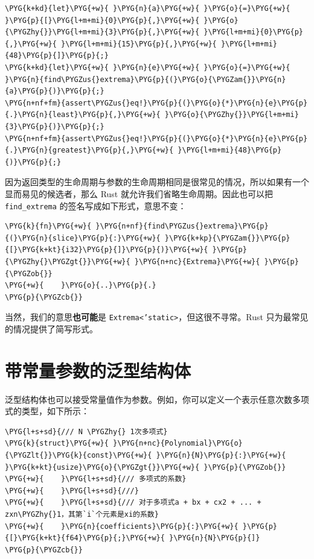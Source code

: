 \begin{Verbatim}[commandchars=\\\{\},breaklines=true,breakanywhere=true,fontsize=\codefont,xleftmargin=17bp]
\PYG{k+kd}{let}\PYG{+w}{ }\PYG{n}{a}\PYG{+w}{ }\PYG{o}{=}\PYG{+w}{ }\PYG{p}{[}\PYG{l+m+mi}{0}\PYG{p}{,}\PYG{+w}{ }\PYG{o}{\PYGZhy{}}\PYG{l+m+mi}{3}\PYG{p}{,}\PYG{+w}{ }\PYG{l+m+mi}{0}\PYG{p}{,}\PYG{+w}{ }\PYG{l+m+mi}{15}\PYG{p}{,}\PYG{+w}{ }\PYG{l+m+mi}{48}\PYG{p}{]}\PYG{p}{;}
\PYG{k+kd}{let}\PYG{+w}{ }\PYG{n}{e}\PYG{+w}{ }\PYG{o}{=}\PYG{+w}{ }\PYG{n}{find\PYGZus{}extrema}\PYG{p}{(}\PYG{o}{\PYGZam{}}\PYG{n}{a}\PYG{p}{)}\PYG{p}{;}
\PYG{n+nf+fm}{assert\PYGZus{}eq!}\PYG{p}{(}\PYG{o}{*}\PYG{n}{e}\PYG{p}{.}\PYG{n}{least}\PYG{p}{,}\PYG{+w}{ }\PYG{o}{\PYGZhy{}}\PYG{l+m+mi}{3}\PYG{p}{)}\PYG{p}{;}
\PYG{n+nf+fm}{assert\PYGZus{}eq!}\PYG{p}{(}\PYG{o}{*}\PYG{n}{e}\PYG{p}{.}\PYG{n}{greatest}\PYG{p}{,}\PYG{+w}{ }\PYG{l+m+mi}{48}\PYG{p}{)}\PYG{p}{;}
\end{Verbatim}

因为返回类型的生命周期与参数的生命周期相同是很常见的情况，所以如果有一个显而易见的候选者，那么 Rust 就允许我们省略生命周期。因此也可以把 \texttt{find\_extrema} 的签名写成如下形式，意思不变：

\begin{Verbatim}[commandchars=\\\{\},breaklines=true,breakanywhere=true,fontsize=\codefont,xleftmargin=17bp]
\PYG{k}{fn}\PYG{+w}{ }\PYG{n+nf}{find\PYGZus{}extrema}\PYG{p}{(}\PYG{n}{slice}\PYG{p}{:}\PYG{+w}{ }\PYG{k+kp}{\PYGZam{}}\PYG{p}{[}\PYG{k+kt}{i32}\PYG{p}{]}\PYG{p}{)}\PYG{+w}{ }\PYG{p}{\PYGZhy{}\PYGZgt{}}\PYG{+w}{ }\PYG{n+nc}{Extrema}\PYG{+w}{ }\PYG{p}{\PYGZob{}}
\PYG{+w}{    }\PYG{o}{..}\PYG{p}{.}
\PYG{p}{\PYGZcb{}}
\end{Verbatim}

当然，我们的意思\textbf{也可能}是 \texttt{Extrema<'static>}，但这很不寻常。Rust 只为最常见的情况提供了简写形式。

\section{带常量参数的泛型结构体}

泛型结构体也可以接受常量值作为参数。例如，你可以定义一个表示任意次数多项式的类型，如下所示：

\begin{Verbatim}[commandchars=\\\{\},breaklines=true,breakanywhere=true,fontsize=\codefont,xleftmargin=17bp]
\PYG{l+s+sd}{/// N \PYGZhy{} 1次多项式}
\PYG{k}{struct}\PYG{+w}{ }\PYG{n+nc}{Polynomial}\PYG{o}{\PYGZlt{}}\PYG{k}{const}\PYG{+w}{ }\PYG{n}{N}\PYG{p}{:}\PYG{+w}{ }\PYG{k+kt}{usize}\PYG{o}{\PYGZgt{}}\PYG{+w}{ }\PYG{p}{\PYGZob{}}
\PYG{+w}{    }\PYG{l+s+sd}{/// 多项式的系数}
\PYG{+w}{    }\PYG{l+s+sd}{///}
\PYG{+w}{    }\PYG{l+s+sd}{/// 对于多项式a + bx + cx2 + ... + zxn\PYGZhy{}1，其第`i`个元素是xi的系数}
\PYG{+w}{    }\PYG{n}{coefficients}\PYG{p}{:}\PYG{+w}{ }\PYG{p}{[}\PYG{k+kt}{f64}\PYG{p}{;}\PYG{+w}{ }\PYG{n}{N}\PYG{p}{]}
\PYG{p}{\PYGZcb{}}
\end{Verbatim}

